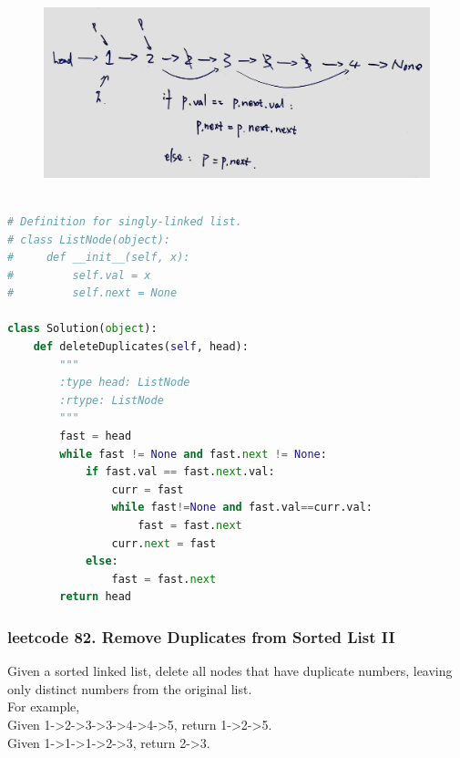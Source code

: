 \documentclass[a4paper,10pt]{article}
\begin{document}
\begin{figure}[h]
    \includegraphics[width=\textwidth]{leetcode83.jpg}
    \centering \\
\end{figure}

\begin{lstlisting}[language=Python, caption=Problem83. Remove Duplicates from Sorted List]

# Definition for singly-linked list.
# class ListNode(object):
#     def __init__(self, x):
#         self.val = x
#         self.next = None

class Solution(object):
    def deleteDuplicates(self, head):
        """
        :type head: ListNode
        :rtype: ListNode
        """
        fast = head
        while fast != None and fast.next != None:
            if fast.val == fast.next.val:
                curr = fast
                while fast!=None and fast.val==curr.val:
                    fast = fast.next
                curr.next = fast
            else:
                fast = fast.next
        return head
\end{lstlisting}


\subsubsection{leetcode 82. Remove Duplicates from Sorted List II}
Given a sorted linked list, delete all nodes that have duplicate numbers, leaving only distinct numbers from the original list.\\

\noindent For example,\\
\indent Given 1->2->3->3->4->4->5, return 1->2->5. \\
\indent Given 1->1->1->2->3, return 2->3. \\
\end{document}
